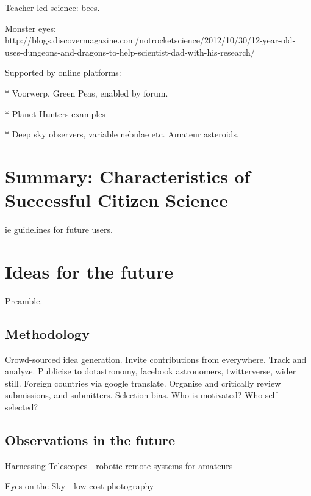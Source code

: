 \documentclass{ar2e}
\begin{document}
Teacher-led science: bees. 

Monster eyes:
http://blogs.discovermagazine.com/notrocketscience/2012/10/30/12-year-old-uses-dungeons-and-dragons-to-help-scientist-dad-with-his-research/

Supported by online platforms:

* Voorwerp, Green Peas, enabled by forum.

* Planet Hunters examples

* Deep sky observers, variable nebulae etc. Amateur asteroids.


\section{Summary: Characteristics of Successful Citizen Science}
\label{sec:guidelines}

ie guidelines for future users.



\section{Ideas for the future}
\label{sec:future}

Preamble.

\subsection{Methodology}
\label{sec:future:method}

Crowd-sourced idea generation. 
Invite contributions from everywhere. Track and
analyze. 
Publicise to dotastronomy, facebook astronomers, twitterverse, wider still.
Foreign countries via google translate.
Organise and critically review submissions, and submitters. Selection bias.
Who is motivated? Who self-selected? 


\subsection{Observations in the future}
\label{sec:future:obs}

Harnessing Telescopes - robotic remote systems for amateurs

Eyes on the Sky - low cost photography
\end{document}
